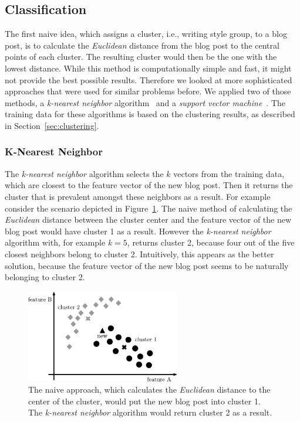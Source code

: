 \subsection{Classification}
\label{sec:impl_classification}


The first naive idea, which assigns a cluster, i.e., writing style group, to a blog post, is to calculate the \textit{Euclidean} distance from the blog post to the central points of each cluster.
The resulting cluster would then be the one with the lowest distance.
While this method is computationally simple and fast, it might not provide the best possible results.
Therefore we looked at more sophisticated approaches that were used for similar problems before.
We applied two of those methods, a \textit{k-nearest neighbor} algorithm~\cite{peterson2009k} and a \textit{support vector machine}~\cite{kolari2006svms}.
The training data for these algorithms is based on the clustering results, as described in Section~\ref{sec:clustering}.


\subsubsection{K-Nearest Neighbor}
\label{sec:k_nearest_neighbor}


The \textit{k-nearest neighbor} algorithm selects the $k$ vectors from the training data, which are closest to the feature vector of the new blog post.
Then it returns the cluster that is prevalent amongst these neighbors as a result.
For example consider the scenario depicted in Figure~\ref{fig:naive}.
The naive method of calculating the \textit{Euclidean} distance between the cluster center and the feature vector of the new blog post would have cluster 1 as a result.
However the \textit{k-nearest neighbor} algorithm with, for example $k=5$, returns cluster 2, because four out of the five closest neighbors belong to cluster 2.
Intuitively, this appears as the better solution, because the feature vector of the new blog post seems to be naturally belonging to cluster 2.


\begin{figure}[ht!]
    \centering
    \includegraphics[width=0.6\textwidth]{images/naive.pdf}
    \caption{The naive approach, which calculates the \textit{Euclidean} distance to the center of the cluster, would put the new blog post into cluster 1. The \textit{k-nearest neighbor} algorithm would return cluster 2 as a result.}
    \label{fig:naive}
\end{figure}


